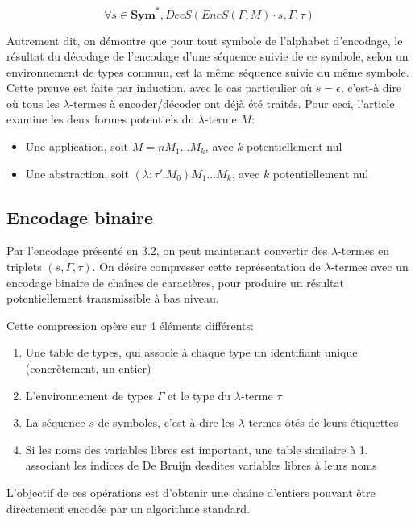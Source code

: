 \documentclass[titlepage]{article}
\providecommand{\tightlist}{%
  \setlength{\itemsep}{0pt}\setlength{\parskip}{0pt}}
\begin{document}
\[\forall s \in \textbf{Sym}^*, DecS(EncS(\Gamma, M) \cdot s,\Gamma,\tau)\]

Autrement dit, on démontre que pour tout symbole de l'alphabet
d'encodage, le résultat du décodage de l'encodage d'une séquence suivie
de ce symbole, selon un environnement de types commun, est la même
séquence suivie du même symbole. Cette preuve est faite par induction,
avec le cas particulier où \(s = \epsilon\), c'est-à dire où tous les
\(\lambda\)-termes à encoder/décoder ont déjà été traités. Pour ceci,
l'article examine les deux formes potentiels du \(\lambda\)-terme \(M\):

\begin{itemize}
\tightlist
\item
  Une application, soit \(M = nM_1...M_k\), avec \(k\) potentiellement
  nul
\item
  Une abstraction, soit \((\lambda:\tau'.M_0)M_1...M_k\), avec \(k\)
  potentiellement nul
\end{itemize}

\subsection{Encodage binaire}\label{encodage-binaire}

Par l'encodage présenté en 3.2, on peut maintenant convertir des
\(\lambda\)-termes en triplets \((s, \Gamma, \tau)\). On désire
compresser cette représentation de \(\lambda\)-termes avec un encodage
binaire de chaînes de caractères, pour produire un résultat
potentiellement transmissible à bas niveau.

Cette compression opère sur 4 éléments différents:

\begin{enumerate}
\def\labelenumi{\arabic{enumi}.}
\tightlist
\item
  Une table de types, qui associe à chaque type un identifiant unique
  (concrètement, un entier)
\item
  L'environnement de types \(\Gamma\) et le type du \(\lambda\)-terme
  \(\tau\)
\item
  La séquence \(s\) de symboles, c'est-à-dire les \(\lambda\)-termes
  ôtés de leurs étiquettes
\item
  Si les noms des variables libres est important, une table similaire à
  1. associant les indices de De Bruijn desdites variables libres à
  leurs noms
\end{enumerate}

L'objectif de ces opérations est d'obtenir une chaîne d'entiers pouvant
être directement encodée par un algorithme standard.
\end{document}
